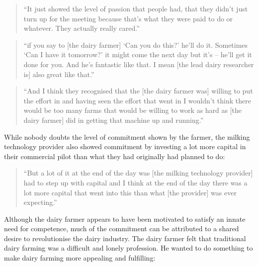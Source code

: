 \begin{quote}
\small
\enquote{It just showed the level of passion that people had, that they didn't just turn up for the meeting because that's what they were paid to do or whatever. They actually really cared.} \\
\end{quote}

\begin{quote}
\small
\enquote{if you say to [the dairy farmer] \enquote{Can you do this?} he'll do it. Sometimes \enquote{Can I have it tomorrow?} it might come the next day but it's – he'll get it done for you. And he’s fantastic like that.  I mean [the lead dairy researcher is] also great like that.} \\
\end{quote}

\begin{quote}
\small
\enquote{And I think they recognised that the [the dairy farmer was] willing to put the effort in and having seen the effort that went in I wouldn't think there would be too many farms that would be willing to work as hard as [the dairy farmer] did in getting that machine up and running.} \\
\end{quote}

While nobody doubts the level of commitment shown by the farmer, the milking technology provider also showed commitment by investing a lot more capital in their commercial pilot than what they had originally had planned to do:

\begin{quote}
\small
\enquote{But a lot of it at the end of the day was [the milking technology provider] had to step up with capital and I think at the end of the day there was a lot more capital that went into this than what [the provider] was ever expecting.} \\
\end{quote}

Although the dairy farmer appears to have been motivated to satisfy an innate need for competence, much of the commitment can be attributed to a shared desire to revolutionise the dairy industry. The dairy farmer felt that traditional dairy farming was a difficult and lonely profession. He wanted to do something to make dairy farming more appealing and fulfilling:

